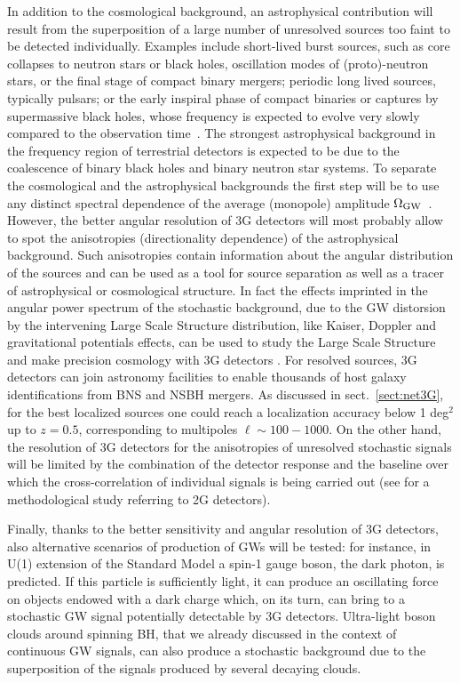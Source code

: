 In addition to the cosmological background, an astrophysical contribution will  result from the superposition of a large number of unresolved sources too faint to be detected individually. Examples include short-lived burst sources, such as core collapses to neutron stars  or black holes, oscillation modes of (proto)-neutron stars, or the  final stage of compact binary mergers; periodic long lived sources, typically pulsars; or  the early inspiral phase of compact binaries or captures by supermassive black holes, whose frequency is expected to evolve very slowly compared to the observation time~\cite{Regimbau:2011rp}. The strongest astrophysical background in the frequency region of terrestrial detectors is expected to be due to the coalescence of binary black holes and binary neutron star systems.   To separate the cosmological and the astrophysical backgrounds the first step will be to use any distinct spectral dependence of the average (monopole) amplitude $\Omega_{\rm GW}$~\cite{Caprini:2019pxz}.   
However,  the better angular resolution of 3G detectors will most probably allow to spot the anisotropies (directionality dependence) of the astrophysical background. Such anisotropies contain information about the angular distribution of the sources and can be used as a tool for source separation as well as a tracer of astrophysical or cosmological structure. In fact the effects imprinted in the angular power spectrum of the stochastic background, due to the GW distorsion  by the intervening Large Scale Structure  distribution, like Kaiser, Doppler and gravitational potentials effects, can be used to study the Large Scale Structure and  make precision cosmology with 3G detectors \cite{Cusin:2017fwz, Cusin:2018rsq,Jenkins:2018uac,Jenkins:2018kxc,Jenkins:2019cau,Cusin:2019jpv,Bertacca:2019fnt,Canas-Herrera:2019npr}. 
For resolved sources, 3G detectors can join  astronomy facilities to enable thousands of host galaxy identifications from BNS and NSBH mergers. As discussed in sect.~\ref{sect:net3G}, for the best localized sources one could reach a localization accuracy below 1 deg$^2$ up to $z=0.5$, corresponding to multipoles $\ell \sim 100-1000$.
On the other hand, the resolution of 3G detectors for  the anisotropies of unresolved stochastic signals will be limited by the combination of the detector response and the baseline over which the cross-correlation of individual signals is being carried out (see \cite{Renzini:2018vkx} for a methodological study referring to 2G detectors). 


Finally, thanks to the better sensitivity and angular resolution of 3G detectors, also alternative scenarios of production of GWs  will be tested:
 for instance, in U(1) extension of the Standard Model a spin-1 gauge boson, the dark photon, is predicted. If this particle is sufficiently light, it can produce an oscillating force on objects endowed with a dark charge which, on its turn, can bring to a stochastic GW signal potentially detectable by 3G detectors. Ultra-light boson clouds around spinning BH, that we already discussed in the context of continuous GW signals, can also produce a stochastic background due to the superposition of the signals produced by several decaying clouds.

